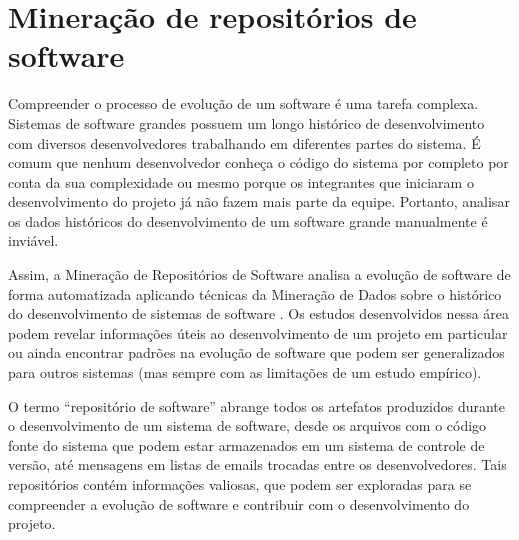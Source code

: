 \documentclass[a4paper, 12pt, twoside]{book}
\begin{document}
    \section{Mineração de repositórios de software} \label{sc:mineracao}
        Compreender o processo de evolução de um software é uma tarefa complexa. Sistemas de software grandes possuem um longo histórico de desenvolvimento com diversos desenvolvedores trabalhando em diferentes partes do sistema. É comum que nenhum desenvolvedor conheça o código do sistema por completo por conta da sua complexidade ou mesmo porque os integrantes que iniciaram o desenvolvimento do projeto já não fazem mais parte da equipe. Portanto, analisar os dados históricos do desenvolvimento de um software grande manualmente é inviável. 

        Assim, a Mineração de Repositórios de Software analisa a evolução de software de forma automatizada aplicando técnicas da Mineração de Dados sobre o histórico do desenvolvimento de sistemas de software \cite{workshop-gustavo-aniche}. Os estudos desenvolvidos nessa área podem revelar informações úteis ao desenvolvimento de um projeto em particular ou ainda encontrar padrões na evolução de software que podem ser generalizados para outros sistemas (mas sempre com as limitações de um estudo empírico).

        O termo ``repositório de software'' abrange todos os artefatos produzidos durante o 
        desenvolvimento de um sistema de software, desde os arquivos com o código fonte do sistema que 
        podem estar armazenados em um sistema de controle de versão, até mensagens em listas de
        emails trocadas entre os desenvolvedores. Tais repositórios contém informações valiosas, 
        que podem ser exploradas para se compreender a evolução de software e contribuir com o 
        desenvolvimento do projeto.
\end{document}
